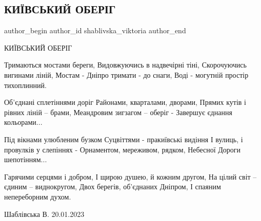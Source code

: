  
 
 
 
 

\subsection{КИЇВСЬКИЙ ОБЕРІГ}
\label{sec:16_02_2023.fb.shablivska_viktoria.1.ki_vskii_ober_g}

\ifcmt
 author_begin
   author_id shablivska_viktoria
 author_end
\fi

КИЇВСЬКИЙ ОБЕРІГ

\obeycr
Тримаються мостами береги,
Видовжуючись в надвечірні тіні,
Скорочуючись вигинами ліній,
Мостам - Дніпро тримати - до снаги,
Воді - могутній простір тихоплинний.
\restorecr

\obeycr
Об'єднані сплетіннями доріг
Районами, кварталами, дворами,
Прямих кутів і рівних ліній – брами,
Меандровим зигзагом – оберіг -
Завершує єднання кольорами...
\restorecr

\obeycr
Під вікнами улюбленим бузком 
Суцвіттями - пракиївські видіння
І вулиць, і провулків у слепіннях -
Орнаментом, мереживом, рядком,
Небесної Дороги шепотінням...
\restorecr

\obeycr
Гарячими серцями і добром, 
І щирою душею, й кожним другом, 
На цілий світ – єдиним – виднокругом,  
Двох берегів, об'єднаних Дніпром,
І спаяним непереборним духом.  
\restorecr

Шаблівська В.  20.01.2023
